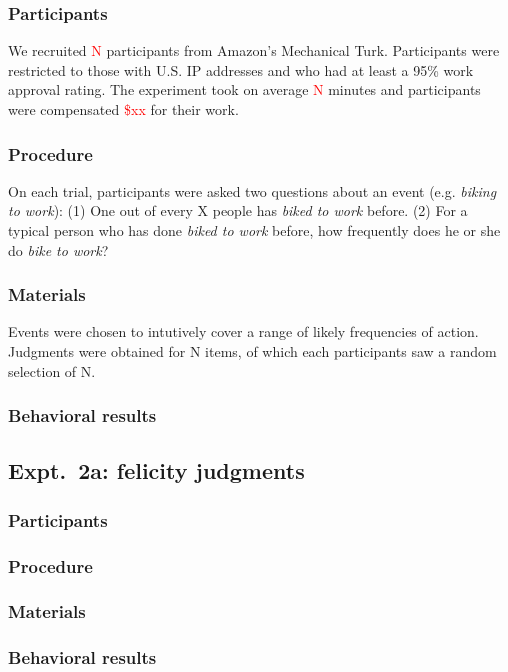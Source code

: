 \documentclass[10pt,letterpaper]{article}
\newcommand{\red}[1]{\textcolor{Red}{#1}}
\begin{document}
\subsubsection{Participants}
We recruited \red{N} participants from Amazon's Mechanical Turk.
Participants were restricted to those with U.S. IP addresses and who had at least a 95\% work approval rating.
The experiment took on average \red{N} minutes and participants were compensated \red{\$xx} for their work.

\subsubsection{Procedure}

On each trial, participants were asked two questions about an event (e.g. \emph{biking to work}):
(1) One out of every X people has \emph{biked to work} before.
(2) For a typical person who has done \emph{biked to work} before, how frequently does he or she do \emph{bike to work}? 

\subsubsection{Materials}

Events were chosen to intutively cover a range of likely frequencies of action. 
Judgments were obtained for N items, of which each participants saw a random selection of N. 

\subsubsection{Behavioral results}

\subsection{Expt.~2a: felicity judgments}
\subsubsection{Participants}
\subsubsection{Procedure}
\subsubsection{Materials}
\subsubsection{Behavioral results}
\end{document}
